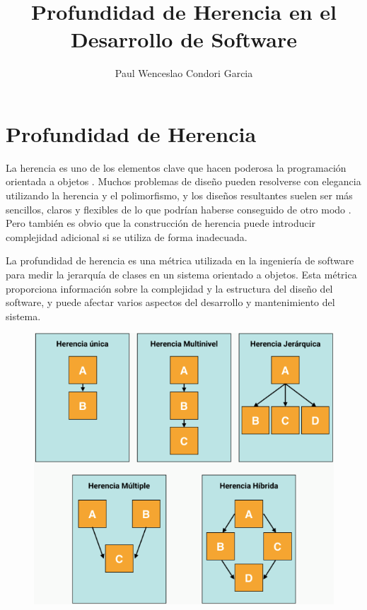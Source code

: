 \documentclass{article}
\title{Profundidad de Herencia en el Desarrollo de Software}
\author{Paul Wenceslao Condori Garcia}
\begin{document}
\maketitle

\section{Profundidad de Herencia} 

La herencia es uno de los elementos clave que hacen poderosa la programación orientada a objetos \cite{meyer1997object}. Muchos problemas de diseño pueden resolverse con elegancia utilizando la herencia y el polimorfismo, y los diseños resultantes suelen ser más sencillos, claros y flexibles de lo que podrían haberse conseguido de otro modo  \cite{gamma1995design}. Pero también es obvio que la construcción de herencia puede introducir complejidad adicional si se utiliza de forma inadecuada.\cite{Prechelt2003inheritance depth}

La profundidad de herencia es una métrica utilizada en la ingeniería de software para medir la jerarquía de clases en un sistema orientado a objetos. Esta métrica proporciona información sobre la complejidad y la estructura del diseño del software, y puede afectar varios aspectos del desarrollo y mantenimiento del sistema.\cite{Fenton1994SoftwareMetrics}
\begin{figure}
  \centering
    \includegraphics{hp1.png}
\end{figure}
\end{document}
